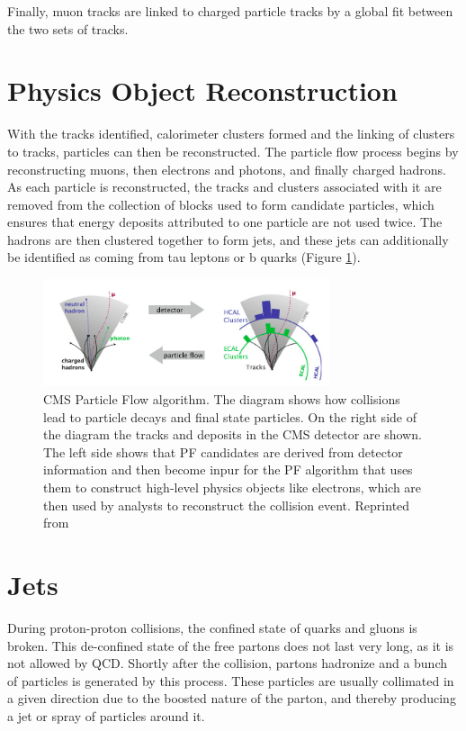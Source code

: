 Finally, muon tracks are linked to charged particle tracks by a global fit between the two sets of tracks.

 \section{Physics Object Reconstruction}

With the tracks identified, calorimeter clusters formed and the linking of clusters to tracks, particles can then be reconstructed. The particle flow process begins by reconstructing muons, then electrons and photons, and finally charged hadrons. As each particle is reconstructed, the tracks and clusters associated with it are removed from the collection of blocks used to form candidate particles, which ensures that energy deposits attributed to one particle are not used twice. The hadrons are then clustered together to form jets, and these jets can additionally be identified as coming from tau leptons or b quarks (Figure \ref{fig:pf}).


 \begin{figure}[h]
  	\label{fig:pf}
 	\centering
 	\includegraphics[width=0.75\textwidth]{figures/jets.png}
 	\singlespace
 	\caption{CMS Particle Flow algorithm. The diagram shows how collisions lead to particle decays and final state particles. On the right side of the diagram the tracks and deposits in the CMS detector are shown. The left side shows that PF candidates are derived from detector information and then become inpur for the PF algorithm that uses them to construct high-level physics objects like electrons, which are then used by analysts to reconstruct the collision event. Reprinted from \cite{CMS-PAS-PFT-09-001}}
 \end{figure}

\section{Jets}

During proton-proton collisions, the confined state of quarks and gluons is broken. This de-confined state of the free partons does not last very long, as it is not allowed by QCD. Shortly after the collision, partons hadronize and a bunch of particles is generated by this process. These particles are usually collimated in a given direction due to the boosted nature of the parton, and thereby producing a jet or spray of particles around it.

